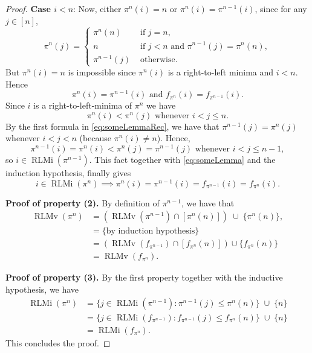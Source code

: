 \documentclass[reqno]{amsart}
\theoremstyle{definition}
\DeclareMathOperator{\RLMv}{RLMv}
\DeclareMathOperator{\RLMi}{RLMi}
\begin{document}
\begin{proof}
\noindent
\textbf{Case $i<n$}: 
Now, either $\pi^n(i)=n$ or $\pi^n(i)=\pi^{n-1}(i)$,
since for any $j \in [n]$,
\begin{equation*}
    \pi^n(j)=\begin{cases}
             \pi^n(n) &\text{ if }j=n,\\
             n &\text{ if }j<n\text{ and } \pi^{n-1}(j)=\pi^n(n),\\
             \pi^{n-1}(j) &\text{ otherwise.}
             \end{cases}
\end{equation*}
But $\pi^n(i)=n$ is impossible since $\pi^n(i)$ is a right-to-left minima and $i<n$.
Hence 
\begin{equation}\label{eq:someLemma}
 \pi^n(i)=\pi^{n-1}(i) \text{ and } f_{\pi^n}(i)=f_{\pi^{n-1}}(i).
\end{equation}
\medskip 
Since $i$ is a right-to-left-minima of $\pi^n$ we have
\[
 \pi^n(i) < \pi^n(j) \text{ whenever $i < j \leq n$}.
\]
By the first formula in \eqref{eq:someLemmaRec}, 
we have that $\pi^{n-1}(j)=\pi^{n}(j)$ whenever $i<j<n$
(because $\pi^n(i) \neq n$).
Hence,
\[
 \pi^{n-1}(i) = \pi^n(i) < \pi^n(j) = \pi^{n-1}(j) \text{ whenever } i < j \leq n-1,
\]
so $i \in \RLMi(\pi^{n-1})$. This fact together
with \eqref{eq:someLemma} and the induction hypothesis, 
finally gives
\[
i\in \RLMi(\pi^n) \implies \pi^n(i) = \pi^{n-1}(i)=f_{\pi^{n-1}}(i)=f_{\pi^n}(i).
\]

\medskip 
\noindent
\textbf{Proof of property (2).}
By definition of $\pi^{n-1}$, we have that
\begin{align*}
    \RLMv(\pi^n) &=(\RLMv(\pi^{n-1})\cap [\pi^n(n)]) \; \cup \; \{\pi^n(n)\},  \\
    &= \{ \text{by induction hypothesis} \} \\
    &=(\RLMv(f_{\pi^{n-1}})\cap[f_{\pi^n}(n)])\cup\{f_{\pi^n}(n)\}\\
    &=\RLMv(f_{\pi^n}).
\end{align*}

\medskip 
\noindent
\textbf{Proof of property (3).}
By the first property together with the inductive hypothesis,
we have
\begin{align*}
    \RLMi(\pi^n) &= \{j \in \RLMi(\pi^{n-1}) : \pi^{n-1}(j) \leq \pi^n(n) \} \; \cup \; \{n\} \\
    &=\{j \in \RLMi(f_{\pi^{n-1}}): f_{\pi^{n-1}}(j) \leq f_{\pi^n}(n)\} \; \cup \; \{n\}\\
    &=\RLMi(f_{\pi^n}).
\end{align*}
This concludes the proof.
\end{proof}
\end{document}
